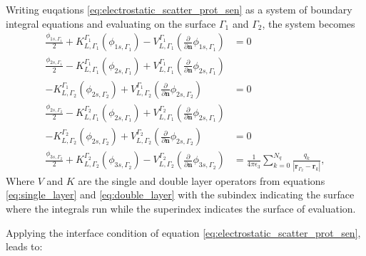Writing euqations \eqref{eq:electrostatic_scatter_prot_sen} as a system 
of boundary integral equations and evaluating on the surface $\Gamma_1$ and
$\Gamma_2$, the system becomes
%
\begin{align} \label{eq:integral_eq_lspr_nobc_system}
\frac{\phi_{1s,\Gamma_1}}{2}+ K_{L,\Gamma_1}^{\Gamma_1}(\phi_{1s,\Gamma_1}) - V_{L,\Gamma_1}^{\Gamma_1} \left(\frac{\partial}{\partial \mathbf{n}}\phi_{1s,\Gamma_1} \right) &= 0  \nonumber \\
\frac{\phi_{2s,\Gamma_1}}{2} - K_{L,\Gamma_1}^{\Gamma_1}(\phi_{2s,\Gamma_1}) + V_{L,\Gamma_1}^{\Gamma_1} \left(\frac{\partial}{\partial \mathbf{n}}\phi_{2s,\Gamma_1} \right) \nonumber\\
 - K_{L,\Gamma_2}^{\Gamma_1}(\phi_{2s,\Gamma_2}) + V_{L,\Gamma_2}^{\Gamma_1} \left(\frac{\partial}{\partial \mathbf{n}}\phi_{2s,\Gamma_2} \right) &= 0  \nonumber \\
\frac{\phi_{2s,\Gamma_2}}{2} - K_{L,\Gamma_1}^{\Gamma_2}(\phi_{2s,\Gamma_1}) + V_{L,\Gamma_1}^{\Gamma_2} \left(\frac{\partial}{\partial \mathbf{n}}\phi_{2s,\Gamma_1} \right) \nonumber \\ 
- K_{L,\Gamma_2}^{\Gamma_2}(\phi_{2s,\Gamma_2}) + V_{L,\Gamma_2}^{\Gamma_2} \left(\frac{\partial}{\partial \mathbf{n}}\phi_{2s,\Gamma_2} \right) &= 0  \nonumber \\
\frac{\phi_{3s,\Gamma_2}}{2} + K_{L,\Gamma_2}^{\Gamma_2}(\phi_{3s,\Gamma_2}) - V_{L,\Gamma_2}^{\Gamma_2} \left( \frac{\partial}{\partial \mathbf{n}} \phi_{3s,\Gamma_2} \right) &= \frac{1}{4\pi\epsilon_3} \sum_{k=0}^{N_q} \frac{q_k}{|\mathbf{r}_{\Gamma_2} - \mathbf{r}_k|} ,
\end{align}
%
Where $V$ and $K$ are the single and double layer operators from equations 
\eqref{eq:single_layer} and \eqref{eq:double_layer} with the subindex indicating
the surface where the integrals run while the superindex indicates the surface of
evaluation. 

Applying the interface condition of equation \eqref{eq:electrostatic_scatter_prot_sen},
leads to: 

